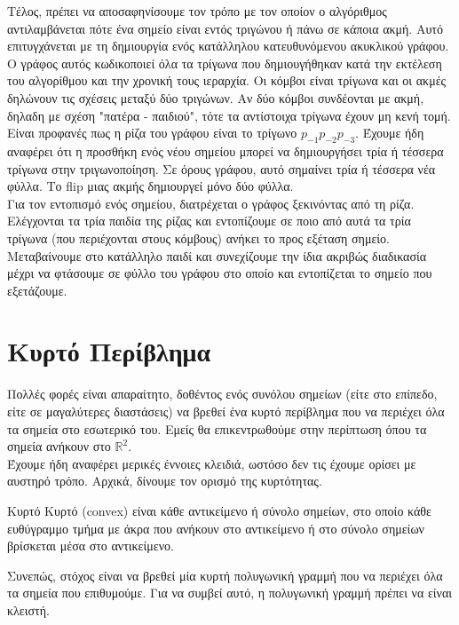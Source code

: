 \documentclass[oneside,12pt]{book}
\newcommand{\R}{\mathbb{R}}
\theoremstyle{definition}
\begin{document}
Τέλος, πρέπει να αποσαφηνίσουμε τον τρόπο με τον οποίον ο αλγόριθμος αντιλαμβάνεται πότε ένα σημείο είναι εντός τριγώνου ή πάνω σε κάποια ακμή. Αυτό επιτυγχάνεται με τη δημιουργία ενός κατάλληλου κατευθυνόμενου ακυκλικού γράφου. Ο γράφος αυτός κωδικοποιεί όλα τα τρίγωνα που δημιουγήθηκαν κατά την εκτέλεση του αλγορίθμου και την χρονική τους ιεραρχία. Οι κόμβοι είναι τρίγωνα και οι ακμές δηλώνουν τις σχέσεις μεταξύ δύο τριγώνων. Αν δύο κόμβοι συνδέονται με ακμή, δηλαδη με σχέση "πατέρα - παιδιού", τότε τα αντίστοιχα τρίγωνα έχουν μη κενή τομή. Είναι προφανές πως η ρίζα του γράφου είναι το τρίγωνο \(p_{-1} p_{-2} p_{-3}\). Έχουμε ήδη αναφέρει ότι η προσθήκη ενός νέου σημείου μπορεί να δημιουργήσει τρία ή τέσσερα τρίγωνα στην τριγωνοποίηση. Σε όρους γράφου, αυτό σημαίνει τρία ή τέσσερα νέα φύλλα. Το flip μιας ακμής δημιουργεί μόνο δύο φύλλα. \\

Για τον εντοπισμό ενός σημείου, διατρέχεται ο γράφος ξεκινόντας από τη ρίζα. Ελέγχονται τα τρία παιδία της ρίζας και εντοπίζουμε σε ποιο από αυτά τα τρία τρίγωνα (που περιέχονται στους κόμβους) ανήκει το προς εξέταση σημείο. Μεταβαίνουμε στο κατάλληλο παιδί και συνεχίζουμε την ίδια ακριβώς διαδικασία μέχρι να φτάσουμε σε φύλλο του γράφου στο οποίο και εντοπίζεται το σημείο που εξετάζουμε. \\ 

\section{Κυρτό Περίβλημα}

Πολλές φορές είναι απαραίτητο, δοθέντος ενός συνόλου σημείων (είτε στο επίπεδο, είτε σε μαγαλύτερες διαστάσεις) να βρεθεί ένα κυρτό περίβλημα που να περιέχει όλα τα σημεία στο εσωτερικό του. Εμείς θα επικεντρωθούμε στην περίπτωση όπου τα σημεία ανήκουν στο \(\R^2\). \\

Έχουμε ήδη αναφέρει μερικές έννοιες κλειδιά, ωστόσο δεν τις έχουμε ορίσει με αυστηρό τρόπο. Αρχικά, δίνουμε τον ορισμό της κυρτότητας. \\

\begin{mydefinition}{Κυρτό}{}
	Κυρτό (convex) είναι κάθε αντικείμενο ή σύνολο σημείων, στο οποίο κάθε ευθύγραμμο τμήμα με άκρα που ανήκουν στο αντικείμενο ή στο σύνολο σημείων βρίσκεται μέσα στο αντικείμενο.
\end{mydefinition}

Συνεπώς, στόχος είναι να βρεθεί μία κυρτή πολυγωνική γραμμή που να περιέχει όλα τα σημεία που επιθυμούμε. Για να συμβεί αυτό, η πολυγωνική γραμμή πρέπει να είναι κλειστή. \\
\end{document}
